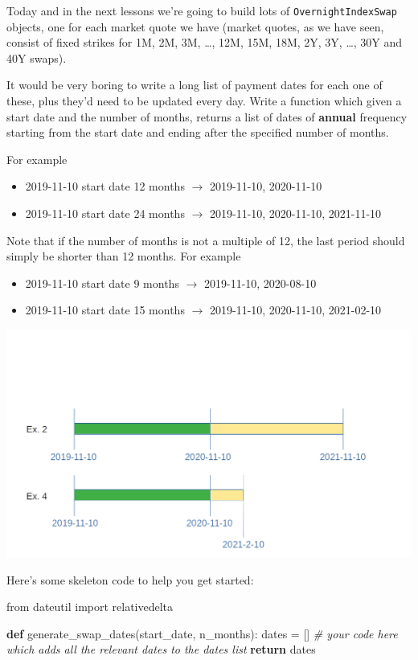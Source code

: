 \documentclass[11pt]{article}
\newenvironment{Shaded}{}{}
\newcommand{\KeywordTok}[1]{\textcolor[rgb]{0.00,0.44,0.13}{\textbf{{#1}}}}
\newcommand{\CommentTok}[1]{\textcolor[rgb]{0.38,0.63,0.69}{\textit{{#1}}}}
\newcommand{\NormalTok}[1]{{#1}}
\newcommand{\ImportTok}[1]{{#1}}
\newcommand{\ControlFlowTok}[1]{\textcolor[rgb]{0.00,0.44,0.13}{\textbf{{#1}}}}
\newcommand{\OperatorTok}[1]{\textcolor[rgb]{0.40,0.40,0.40}{{#1}}}
\begin{document}
Today and in the next lessons we're going to build lots of
\texttt{OvernightIndexSwap} objects, one for each market quote we have
(market quotes, as we have seen, consist of fixed strikes for 1M, 2M,
3M, \ldots{}, 12M, 15M, 18M, 2Y, 3Y, \ldots{}, 30Y and 40Y swaps).

It would be very boring to write a long list of payment dates for each
one of these, plus they'd need to be updated every day. Write a function
which given a start date and the number of months, returns a list of
dates of \textbf{annual} frequency starting from the start date and
ending after the specified number of months.

For example
\begin{itemize}
\item 2019-11-10 start date 12 months \(\rightarrow\) 2019-11-10, 2020-11-10
\item 2019-11-10 start date 24 months \(\rightarrow\) 2019-11-10, 2020-11-10, 2021-11-10
\end{itemize}

Note that if the number of months is not a multiple of 12, the last
period should simply be shorter than 12 months. For example

\begin{itemize}
\item 2019-11-10 start date 9 months \(\rightarrow\) 2019-11-10, 2020-08-10
\item 2019-11-10 start date 15 months \(\rightarrow\) 2019-11-10, 2020-11-10, 2021-02-10
\end{itemize}

\includegraphics[width=\linewidth]{time_flow.png}

Here's some skeleton code to help you get started:

\begin{Shaded}
\begin{Highlighting}[]
\ImportTok{from}\NormalTok{ dateutil }\ImportTok{import}\NormalTok{ relativedelta}

\KeywordTok{def}\NormalTok{ generate_swap_dates(start_date, n_months):}
\NormalTok{    dates }\OperatorTok{=}\NormalTok{ []}
    \CommentTok{# your code here which adds all the relevant dates to the dates list}
    \ControlFlowTok{return}\NormalTok{ dates}
\end{Highlighting}
\end{Shaded}
\end{document}
